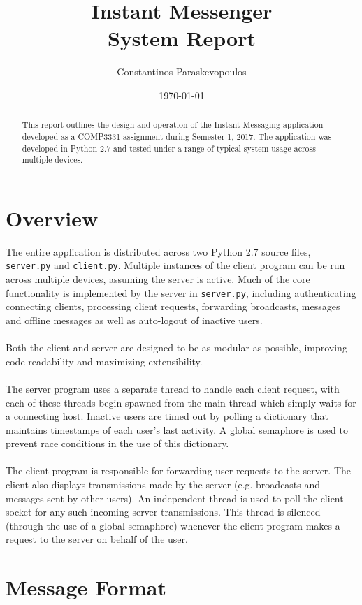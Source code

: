 \documentclass[12pt,a4paper]{article}
\title{Instant Messenger \\ \large System Report}
\author{Constantinos Paraskevopoulos}
\date{\today}
\begin{document}
\maketitle

\begin{abstract}
This report outlines the design and operation of the Instant Messaging application developed as a COMP3331 assignment during Semester 1, 2017. The application was developed in Python 2.7 and tested under a range of typical system usage across multiple devices.
\end{abstract}

\section{Overview}
\label{sec:overview}

The entire application is distributed across two Python 2.7 source files, \verb|server.py| and \verb|client.py|. Multiple instances of the client program can be run across multiple devices, assuming the server is active. Much of the core functionality is implemented by the server in \verb|server.py|, including authenticating connecting clients, processing client requests, forwarding broadcasts, messages and offline messages as well as auto-logout of inactive users.
\\\\
Both the client and server are designed to be as modular as possible, improving code readability and maximizing extensibility.
\\\\
The server program uses a separate thread to handle each client request, with each of these threads begin spawned from the main thread which simply waits for a connecting host. Inactive users are timed out by polling a dictionary that maintains timestamps of each user's last activity. A global semaphore is used to prevent race conditions in the use of this dictionary.
\\\\
The client program is responsible for forwarding user requests to the server. The client also displays transmissions made by the server (e.g. broadcasts and messages sent by other users). An independent thread is used to poll the client socket for any such incoming server transmissions. This thread is silenced (through the use of a global semaphore) whenever the client program makes a request to the server on behalf of the user.

\section{Message Format}
\label{sec:msg_format}
\end{document}
